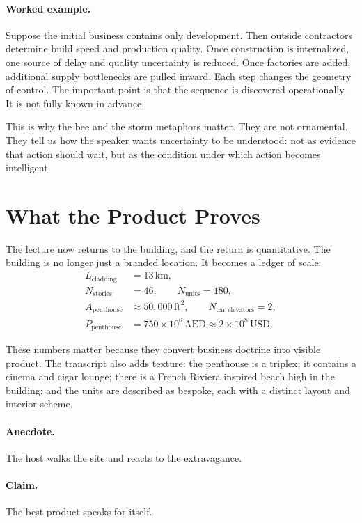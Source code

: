 \paragraph{Worked example.} Suppose the initial business contains only development. Then outside contractors determine build speed and production quality. Once construction is internalized, one source of delay and quality uncertainty is reduced. Once factories are added, additional supply bottlenecks are pulled inward. Each step changes the geometry of control. The important point is that the sequence is discovered operationally. It is not fully known in advance.

This is why the bee and the storm metaphors matter. They are not ornamental. They tell us how the speaker wants uncertainty to be understood: not as evidence that action should wait, but as the condition under which action becomes intelligent.

\section{What the Product Proves}

The lecture now returns to the building, and the return is quantitative. The building is no longer just a branded location. It becomes a ledger of scale:
\begin{align}
L_{\text{cladding}} &= 13\,\mathrm{km},\\
N_{\text{stories}} &= 46, \qquad N_{\text{units}} = 180,\\
A_{\text{penthouse}} &\approx 50{,}000\,\mathrm{ft}^2, \qquad N_{\text{car elevators}} = 2,\\
P_{\text{penthouse}} &= 750 \times 10^{6}\,\mathrm{AED}
\approx 2 \times 10^{8}\,\mathrm{USD}.
\end{align}

These numbers matter because they convert business doctrine into visible product. The transcript also adds texture: the penthouse is a triplex; it contains a cinema and cigar lounge; there is a French Riviera inspired beach high in the building; and the units are described as bespoke, each with a distinct layout and interior scheme.

\paragraph{Anecdote.} The host walks the site and reacts to the extravagance.

\paragraph{Claim.} The best product speaks for itself.

